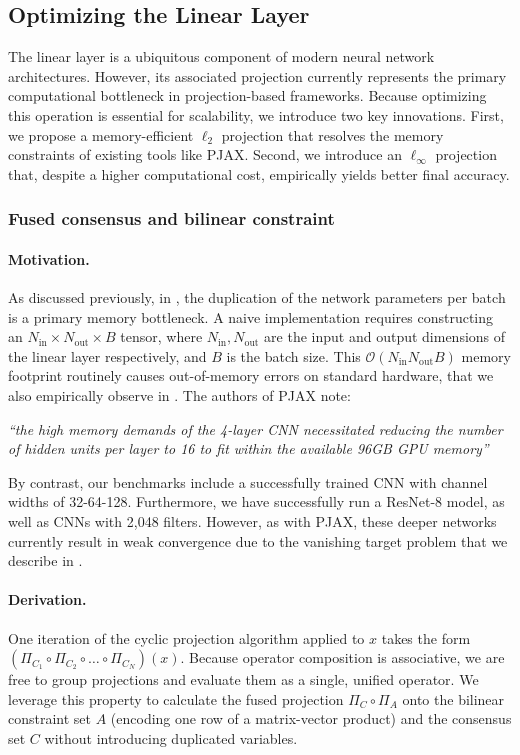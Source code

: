 \documentclass{article}
\let\cref\crtcref
\begin{document}
\subsection{Optimizing the Linear Layer}
The linear layer is a ubiquitous component of modern neural network architectures. However, its associated projection currently represents the primary computational bottleneck in projection-based frameworks. Because optimizing this operation is essential for scalability, we introduce two key innovations. First, we propose a memory-efficient $\ell_2$ projection that resolves the memory constraints of existing tools like PJAX. Second, we introduce an $\ell_\infty$ projection that, despite a higher computational cost, empirically yields better final accuracy.
\label{sec:matmul}
\subsubsection{Fused consensus and bilinear constraint} \label{subsec:fused}
\paragraph{Motivation.}
As discussed previously, in \cite{elser2019learning,bergmeister2025projection}, the duplication of the network parameters per batch is a primary memory bottleneck. A naive implementation requires constructing an $N_{\mathrm{in}} \times N_{\mathrm{out}} \times B$ tensor, where $N_{\mathrm{in}}, N_{\mathrm{out}}$ are the input and output dimensions of the linear layer respectively, and $B$ is the batch size. This $\mathcal{O}(N_{\mathrm{in}}N_{\mathrm{out}}B)$ memory footprint routinely causes out-of-memory errors on standard hardware, that we also empirically observe in \cref{sec:exp-memory-optimizer}. The authors of PJAX \cite{bergmeister2025projection} note: 

\textit{``the high memory demands of the 4-layer CNN necessitated reducing the number of hidden units per layer to 16 to fit within the available 96GB GPU memory''}

By contrast, our benchmarks include a successfully trained CNN with channel widths of 32-64-128. Furthermore, we have successfully run a ResNet-8 model, as well as CNNs with 2,048 filters. However, as with PJAX, these deeper networks currently result in weak convergence due to the vanishing target problem that we describe in \cref{sec:vanishing-target}.
\paragraph{Derivation.}
One iteration of the cyclic projection algorithm applied to $x$ takes the form $(\Pi_{C_1} \circ \Pi_{C_2} \circ \dots \circ \Pi_{C_N})(x)$. Because operator composition is associative, we are free to group projections and evaluate them as a single, unified operator. We leverage this property to calculate the fused projection $\Pi_C \circ \Pi_A$ onto the bilinear constraint set $A$ (encoding one row of a matrix-vector product) and the consensus set $C$ without introducing duplicated variables.
\end{document}
